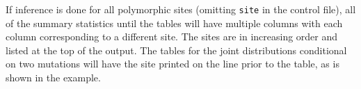 \documentclass[11pt]{article}
\begin{document}
If inference is done for all polymorphic sites (omitting \texttt{site} in the control file), all of the summary statistics until the tables will have multiple columns with each column corresponding to a different site. 
The sites are in increasing order and listed at the top of the output. 
The tables for the joint distributions conditional on two mutations will have the site printed on the line prior to the table, as is shown in the example.

% 
\end{document}
